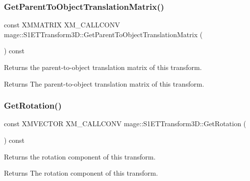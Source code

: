 \subsubsection{\texorpdfstring{Get\+Parent\+To\+Object\+Translation\+Matrix()}{GetParentToObjectTranslationMatrix()}}
{\footnotesize\ttfamily const X\+M\+M\+A\+T\+R\+IX X\+M\+\_\+\+C\+A\+L\+L\+C\+O\+NV mage\+::\+S1\+E\+T\+Transform3\+D\+::\+Get\+Parent\+To\+Object\+Translation\+Matrix (\begin{DoxyParamCaption}{ }\end{DoxyParamCaption}) const\hspace{0.3cm}{\ttfamily [noexcept]}}

Returns the parent-\/to-\/object translation matrix of this transform.

\begin{DoxyReturn}{Returns}
The parent-\/to-\/object translation matrix of this transform. 
\end{DoxyReturn}
\mbox{\label{classmage_1_1_s1_e_t_transform3_d_a14a993c146cdfe6ebb5db8bf1eedef23}} 
\subsubsection{\texorpdfstring{Get\+Rotation()}{GetRotation()}}
{\footnotesize\ttfamily const X\+M\+V\+E\+C\+T\+OR X\+M\+\_\+\+C\+A\+L\+L\+C\+O\+NV mage\+::\+S1\+E\+T\+Transform3\+D\+::\+Get\+Rotation (\begin{DoxyParamCaption}{ }\end{DoxyParamCaption}) const\hspace{0.3cm}{\ttfamily [noexcept]}}

Returns the rotation component of this transform.

\begin{DoxyReturn}{Returns}
The rotation component of this transform. 
\end{DoxyReturn}
\mbox{\label{classmage_1_1_s1_e_t_transform3_d_a54901eabed50d96af9705580557d25ab}} 
